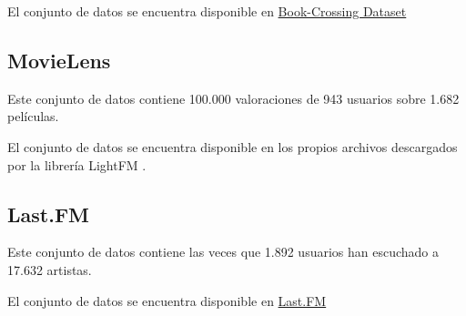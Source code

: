 El conjunto de datos se encuentra disponible en \href{http://www2.informatik.uni-freiburg.de/~cziegler/BX/BX-CSV-Dump.zip}{Book-Crossing Dataset}
\subsection{MovieLens}\label{movielens}
Este conjunto de datos \cite{GroupLens1998} contiene 100.000 valoraciones de 943 usuarios sobre 1.682 películas.

El conjunto de datos se encuentra disponible en los propios archivos descargados por la librería LightFM \cite{DBLP:conf/recsys/Kula15}.
\subsection{Last.FM}\label{last.fm}
Este conjunto de datos \cite{Cantador:RecSys2011} contiene las veces que 1.892 usuarios han escuchado a 17.632 artistas.

El conjunto de datos se encuentra disponible en \href{http://files.grouplens.org/datasets/hetrec2011/hetrec2011-lastfm-2k.zip}{Last.FM}
